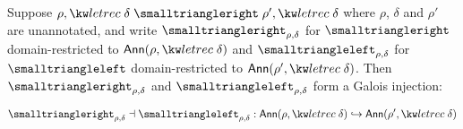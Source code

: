\begin{lemma}
\label{lem:gc-closedefs}

Suppose $\rho, \exLetrecDef{\delta} \closeDefs \rho', \exLetrecDef{\delta}$
where $\rho$, $\delta$ and $\rho'$ are unannotated, and write $\closeDefs_{\rho,
\delta}$ for $\closeDefs$ domain-restricted to $\Ann{\rho,
\exLetrecDef{\delta}}$ and $\uncloseDefs_{\rho, \delta}$ for $\uncloseDefs$
domain-restricted to $\Ann{\rho',\exLetrecDef{\delta}}$. Then $\closeDefs_{\rho,
\delta}$ and $\uncloseDefs_{\rho, \delta}$ form a Galois injection:

\[
   {\closeDefs_{\rho, \delta}} \adjoint {\uncloseDefs_{\rho, \delta}}:
   \Ann{\rho, \exLetrecDef{\delta}} \inj \Ann{\rho',\exLetrecDef{\delta}}
\]

\end{lemma}

